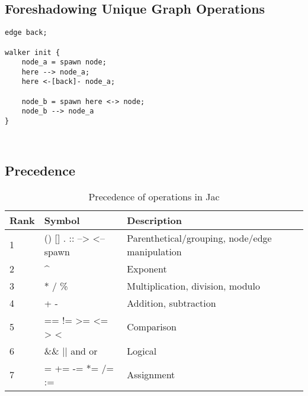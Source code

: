 \subsection*{Foreshadowing Unique Graph Operations}
\begin{description}
    \begin{lstlisting}[caption={Preview of graph operators},
        label={code:moremath}]
edge back;

walker init {
    node_a = spawn node;
    here --> node_a;
    here <-[back]- node_a;

    node_b = spawn here <-> node;
    node_b --> node_a
}
    \end{lstlisting}
    \item[Output] \texttt{ }
    \item[Description] \texttt{}

\end{description}


\subsection*{Precedence}

\begin{table}[h]
    \small
    \centering
    \begin{tabular}{l l l}
        \toprule
        \textbf{Rank} & \textbf{Symbol}          & \textbf{Description}                           \\
        \midrule
        1             & () [] . :: --> <-- spawn & Parenthetical/grouping, node/edge manipulation \\
        2             & \textasciicircum         & Exponent                                       \\
        3             & * / \%                   & Multiplication, division, modulo               \\
        4             & + -                      & Addition, subtraction                          \\
        5             & == != >= <= > <          & Comparison                                     \\
        6             & \&\& || and or           & Logical                                        \\
        7             & = += -= *= /= :=         & Assignment                                     \\
        \bottomrule
    \end{tabular}
    \caption{Precedence of operations in Jac}
    \label{tab:jacprecedence} %
\end{table}